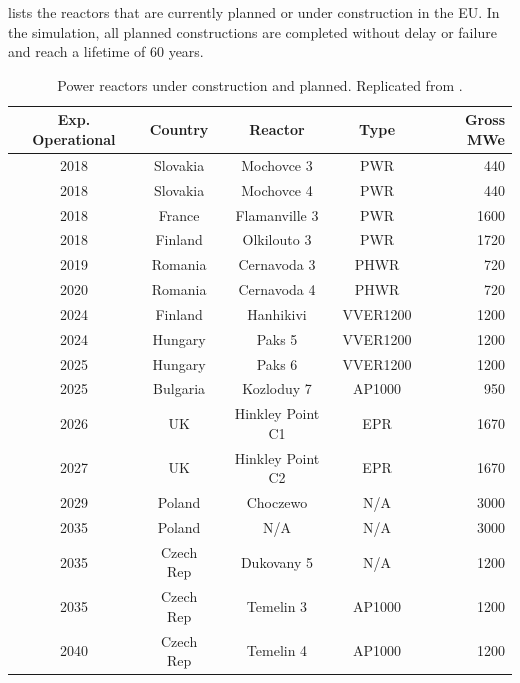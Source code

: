  lists the reactors that are currently  planned or
under construction in the \gls{EU}. In the simulation, all  planned constructions are completed 
without delay or failure and reach a lifetime of 60 years.  

\pagebreak
\begin{table}[h]
    \centering
    \caption {Power reactors under construction and planned. Replicated from \cite{world_nuclear_association_nuclear_2017}.}
    \label{tab:eu_deployment}
    \begin{tabular}{ccccr}
        \hline
        \textbf{Exp. Operational }&\textbf{Country} &\textbf{Reactor} & \textbf{Type} & \textbf{Gross \gls{MWe}}\\
        \hline
        2018 & Slovakia  & Mochovce 3 & PWR & 440\\
        2018 & Slovakia & Mochovce 4 & PWR & 440 \\
        2018 & France & Flamanville 3 & PWR & 1600 \\
        2018 & Finland & Olkilouto 3 & PWR & 1720 \\
        2019 & Romania & Cernavoda 3 & PHWR & 720 \\
        2020 & Romania & Cernavoda 4 & PHWR & 720 \\
        2024 & Finland & Hanhikivi & VVER1200 & 1200 \\
        2024 & Hungary & Paks 5 & VVER1200 & 1200 \\
        2025 & Hungary & Paks 6 & VVER1200 & 1200 \\
        2025 & Bulgaria & Kozloduy 7 & \footnotemark AP1000 & 950 \\
        2026 & UK & Hinkley Point C1 & EPR & 1670 \\
        2027 & UK & Hinkley Point C2 & EPR & 1670 \\
        2029 & Poland & Choczewo & N/A & 3000 \\
        2035 & Poland & N/A & N/A & 3000 \\
        2035 & Czech Rep & Dukovany 5 & N/A & 1200 \\
        2035 & Czech Rep & Temelin 3 & AP1000 & 1200 \\
        2040 & Czech Rep & Temelin 4 & AP1000 & 1200 \\
        \hline
    \end{tabular}
\end{table}

\FloatBarrier

